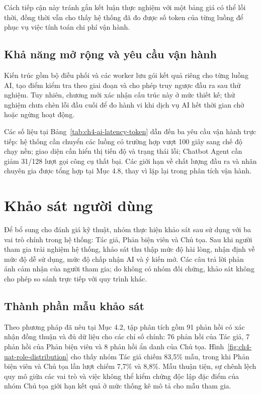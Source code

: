 Cách tiếp cận này tránh gắn kết luận thực nghiệm với một bảng giá có thể lỗi thời, đồng thời vẫn cho thấy hệ thống đã đo được số token của từng luồng để phục vụ việc tính toán chi phí vận hành.

\subsection{Khả năng mở rộng và yêu cầu vận hành}

Kiến trúc gồm bộ điều phối và các worker lưu gói kết quả riêng cho từng luồng AI, tạo điểm kiểm tra theo giai đoạn và cho phép truy ngược đầu ra sau thử nghiệm. Tuy nhiên, chương mới xác nhận cấu trúc này ở mức thiết kế; thử nghiệm chưa chèn lỗi đầu cuối để đo hành vi khi dịch vụ AI hết thời gian chờ hoặc ngừng hoạt động.

Các số liệu tại Bảng~\ref{tab:ch4-ai-latency-token} dẫn đến ba yêu cầu vận hành trực tiếp: hệ thống cần chuyển các luồng có trường hợp vượt 100 giây sang chế độ chạy nền; giao diện cần hiển thị tiến độ và trạng thái lỗi; Chatbot Agent cần giảm 31/128 lượt gọi công cụ thất bại. Các giới hạn về chất lượng đầu ra và nhãn chuyên gia được tổng hợp tại Mục 4.8, thay vì lặp lại trong phân tích vận hành.

\section{Khảo sát người dùng}

Để bổ sung cho đánh giá kỹ thuật, nhóm thực hiện khảo sát sau sử dụng với ba vai trò chính trong hệ thống: Tác giả, Phản biện viên và Chủ tọa. Sau khi người tham gia trải nghiệm hệ thống, khảo sát thu thập mức độ hài lòng, nhận định về mức độ dễ sử dụng, mức độ chấp nhận AI và ý kiến mở. Các câu trả lời phản ánh cảm nhận của người tham gia; do không có nhóm đối chứng, khảo sát không cho phép so sánh trực tiếp với quy trình khác.

\subsection{Thành phần mẫu khảo sát}

Theo phương pháp đã nêu tại Mục 4.2, tập phân tích gồm 91 phản hồi có xác nhận đồng thuận và đủ dữ liệu cho các chỉ số chính: 76 phản hồi của Tác giả, 7 phản hồi của Phản biện viên và 8 phản hồi ẩn danh của Chủ tọa. Hình~\ref{fig:ch4-uat-role-distribution} cho thấy nhóm Tác giả chiếm 83,5\% mẫu, trong khi Phản biện viên và Chủ tọa lần lượt chiếm 7,7\% và 8,8\%. Mẫu thuận tiện, sự chênh lệch quy mô giữa các vai trò và việc không thể kiểm chứng độc lập đặc điểm của nhóm Chủ tọa giới hạn kết quả ở mức thống kê mô tả cho mẫu tham gia.

